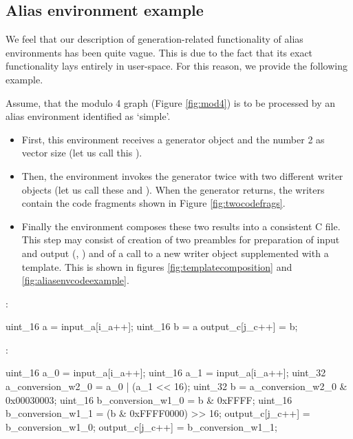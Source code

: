 \subsection*{Alias environment example}

We feel that our description of generation-related functionality of alias environments has been quite vague. This is due to the fact that its exact functionality lays entirely in user-space. For this reason, we provide the following example.

Assume, that the modulo 4 graph (Figure \ref{fig:mod4}) is to be processed by an alias environment identified as `simple'. 

\begin{itemize}
  \item First, this environment receives a generator object and the number 2 as vector size (let us call this ).  
  \item Then, the environment invokes the generator twice with two different writer objects (let us call these  and ). When the generator returns, the writers contain the code fragments shown in Figure \ref{fig:twocodefrags}.
  \item Finally the environment composes these two results into a consistent C file. This step may consist of creation of two preambles for preparation of input and output (, ) and of a call to a new writer object supplemented with a template. This is shown in figures \ref{fig:templatecomposition} and \ref{fig:aliasenvcodeexample}.
\end{itemize}

\FloatBarrier

  \mybeginfigloose
    :
\begin{code}
uint_16 a = input_a[i_a++];
uint_16 b = a %
output_c[j_c++] = b;
\end{code}
    :
\begin{code}
uint_16 a_0 = input_a[i_a++];
uint_16 a_1 = input_a[i_a++];
uint_32 a_conversion_w2_0 = a_0 | (a_1 << 16);
uint_32 b = a_conversion_w2_0 & 0x00030003;
uint_16 b_conversion_w1_0 = b & 0xFFFF;
uint_16 b_conversion_w1_1 = (b & 0xFFFF0000) >> 16;
output_c[j_c++] = b_conversion_w1_0;
output_c[j_c++] = b_conversion_w1_1;
\end{code}


    \mybeginfigloose
{}

